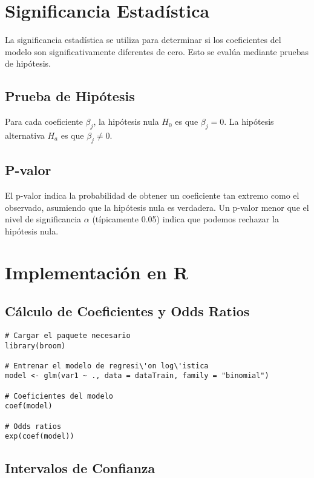 \section{Significancia Estad\'istica}

La significancia estad\'istica se utiliza para determinar si los coeficientes del modelo son significativamente diferentes de cero. Esto se eval\'ua mediante pruebas de hip\'otesis.

\subsection{Prueba de Hip\'otesis}

Para cada coeficiente $\beta_j$, la hip\'otesis nula $H_0$ es que $\beta_j = 0$. La hip\'otesis alternativa $H_a$ es que $\beta_j \neq 0$.

\subsection{P-valor}

El p-valor indica la probabilidad de obtener un coeficiente tan extremo como el observado, asumiendo que la hip\'otesis nula es verdadera. Un p-valor menor que el nivel de significancia $\alpha$ (t\'ipicamente 0.05) indica que podemos rechazar la hip\'otesis nula.

\section{Implementaci\'on en R}

\subsection{C\'alculo de Coeficientes y Odds Ratios}

\begin{verbatim}
# Cargar el paquete necesario
library(broom)

# Entrenar el modelo de regresi\'on log\'istica
model <- glm(var1 ~ ., data = dataTrain, family = "binomial")

# Coeficientes del modelo
coef(model)

# Odds ratios
exp(coef(model))
\end{verbatim}

\subsection{Intervalos de Confianza}


